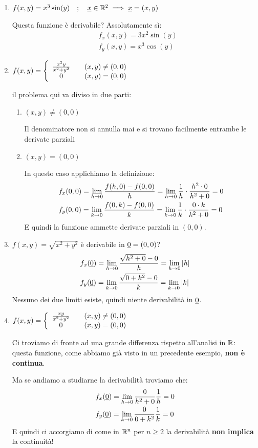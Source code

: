 \begin{enumerate}
	\item $f(x,y)=x^3\sin(y) \quad ; \quad \underline{x} \in \mathbb{R}^2 \implies \underline{x}=(x,y)$
	
	Questa funzione è derivabile? Assolutamente sì:
	\begin{align}
	{}&f_x(x,y)= 3x^2\sin(y)\\
	&f_y(x,y)=x^3 \cos(y)
	\end{align}
	
	\item $f(x,y)=\left\{\begin{array}{cc} \frac{x^2 y}{x^2 + y^2} \quad {}& (x,y)\neq (0,0) \\ 0 \quad &(x,y)=(0,0) \end{array}\right.$
	
	\smallskip
	
	il problema qui va diviso in due parti:
	
	\begin{enumerate}
		\item $(x,y) \neq (0,0)$
		
		Il denominatore non si annulla mai e si trovano facilmente entrambe le derivate parziali
		
		\item $(x,y) = (0,0)$
		
		In questo caso applichiamo la definizione:
		\begin{align}
		{}&f_x(0,0)= \underset{h \rightarrow 0}{\lim} \, \frac{f(h,0) - f(0,0)}{h}= \underset{h \rightarrow 0}{\lim} \, \frac{1}{h} \cdot \frac{h^2 \cdot 0}{h^2 + 0}=0\\ 
		&f_y(0,0)= \underset{k \rightarrow 0}{\lim} \, \frac{f(0,k) - f(0,0)}{k}= \underset{k \rightarrow 0}{\lim} \, \frac{1}{k} \cdot \frac{0 \cdot k}{k^2 + 0}=0
		\end{align}
		E quindi la funzione ammette derivate parziali in $(0,0)$.
		
		\smallskip
	\end{enumerate}

	\item $f(x,y) = \sqrt{x^2 + y^2}$ è derivabile in $\underline{0}=(0,0)$?
	\begin{align}
	{}&f_x(\underline{0})=\underset{h \rightarrow 0}{\lim} \,\frac{\sqrt{h^2 +0} - 0}{h}= \underset{h \rightarrow 0}{\lim} \, |h|\\
	&f_y(\underline{0})=\underset{k \rightarrow 0}{\lim} \,\frac{\sqrt{0+k^2} - 0}{k}= \underset{k \rightarrow 0}{\lim} \, |k|
	\end{align}
	Nessuno dei due limiti esiste, quindi niente derivabilità in $\underline{0}$.

	\item $f(x,y)=\left\{\begin{array}{cc} \frac{xy}{x^2 + y^2} \quad {}&(x,y)\neq (0,0) \\ 0 \quad &(x,y)=(0,0) \end{array}\right.$

	Ci troviamo di fronte ad una grande differenza rispetto all'analisi in $\mathbb{R}$: questa funzione, come abbiamo già visto in un precedente esempio, \textbf{non è continua}. 

	Ma se andiamo a studiarne la derivabilità troviamo che:
	\begin{align}
	{}&f_x(\underline{0}) = \underset{h \rightarrow 0}{\lim} \, \frac{0}{h^2 + 0} \frac{1}{h}=0 \\
	&f_y(\underline{0}) = \underset{k \rightarrow 0}{\lim} \, \frac{0}{0+k^2} \frac{1}{k}=0
	\end{align}
	E quindi ci accorgiamo di come in $\mathbb{R}^n$ per $n\geq 2$ la derivabilità \textbf{non implica} la continuità!
	
\end{enumerate}

